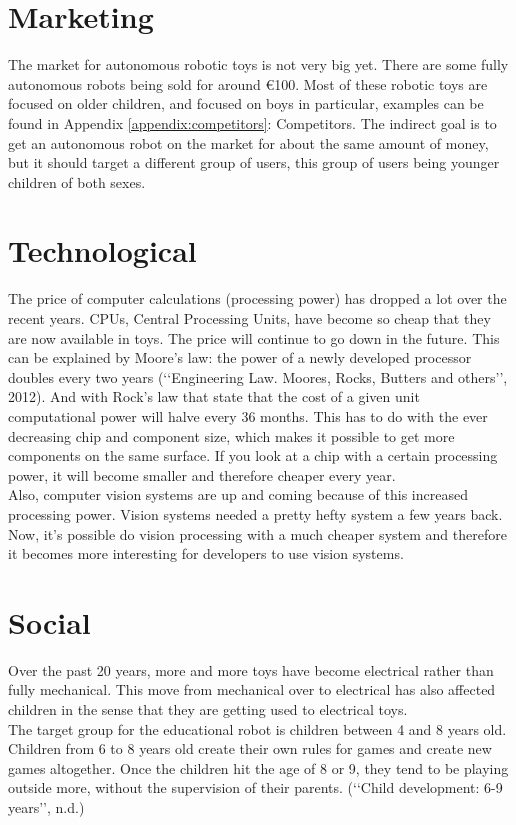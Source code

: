 \documentclass[11pt,twoside,a4paper]{report}
\begin{document}
\section{Marketing}
The market for autonomous robotic toys is not very big yet. There are some fully autonomous robots being sold for around \euro{}100. Most of these robotic toys are focused on older children, and focused on boys in particular, examples can be found in Appendix \ref{appendix:competitors}: Competitors. The indirect goal is to get an autonomous robot on the market for about the same amount of money, but it should target a different group of users, this group of users being younger children of both sexes.
\section{Technological}
The price of computer calculations (processing power) has dropped a lot over the recent years. CPUs, Central Processing Units, have become so cheap that they are now available in toys. The price will continue to go down in the future. This can be explained by Moore\rq{}s law: the power of a newly developed processor doubles every two years (\lq\lq{}Engineering Law. Moores, Rocks, Butters and others\rq\rq{}, 2012). And with Rock\rq{}s law that state that the cost of a given unit computational power will halve every 36 months. This has to do with the ever decreasing chip and component size, which makes it possible to get more components on the same surface. If you look at a chip with a certain processing power, it will become smaller and therefore cheaper every year. \\
Also, computer vision systems are up and coming because of this increased processing power. Vision systems needed a pretty hefty system a few years back. Now, it\rq{}s possible do vision processing with a much cheaper system and therefore it becomes more interesting for developers to use vision systems.
\section{Social}

Over the past 20 years, more and more toys have become electrical rather than fully mechanical. This move from mechanical over to electrical has also affected children in the sense that they are getting used to electrical toys. \\
The target group for the educational robot is children between 4 and 8 years old. Children from 6 to 8 years old create their own rules for games and create new games altogether. Once the children hit the age of 8 or 9, they tend to be playing outside more, without the supervision of their parents. (\lq\lq{}Child development: 6-9 years\rq\rq{}, n.d.)
\end{document}
